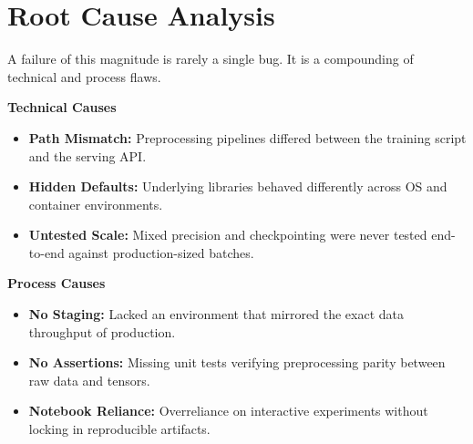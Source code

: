 \documentclass[11pt]{article}
\begin{document}
\vfill
\newpage

\section*{Root Cause Analysis}

\vspace{0.05in}

{\fontsize{11}{13}\selectfont\color{brandgray}
A failure of this magnitude is rarely a single bug. It is a compounding of technical and process flaws.
}

\vspace{0.2in}

\begin{minipage}[t]{0.47\textwidth}

{\large\color{brandorange}\textbf{Technical Causes}}

\vspace{0.1in}
\begin{itemize}[leftmargin=*, itemsep=0.15in, label={\color{brandblue}\textbullet}]
    \item \textbf{Path Mismatch:} Preprocessing pipelines differed between the training script and the serving API.
    \item \textbf{Hidden Defaults:} Underlying libraries behaved differently across OS and container environments.
    \item \textbf{Untested Scale:} Mixed precision and checkpointing were never tested end-to-end against production-sized batches.
\end{itemize}

\end{minipage}
\hfill
\begin{minipage}[t]{0.47\textwidth}

{\large\color{brandorange}\textbf{Process Causes}}

\vspace{0.1in}
\begin{itemize}[leftmargin=*, itemsep=0.15in, label={\color{brandblue}\textbullet}]
    \item \textbf{No Staging:} Lacked an environment that mirrored the exact data throughput of production.
    \item \textbf{No Assertions:} Missing unit tests verifying preprocessing parity between raw data and tensors.
    \item \textbf{Notebook Reliance:} Overreliance on interactive experiments without locking in reproducible artifacts.
\end{itemize}

\end{minipage}
\end{document}
